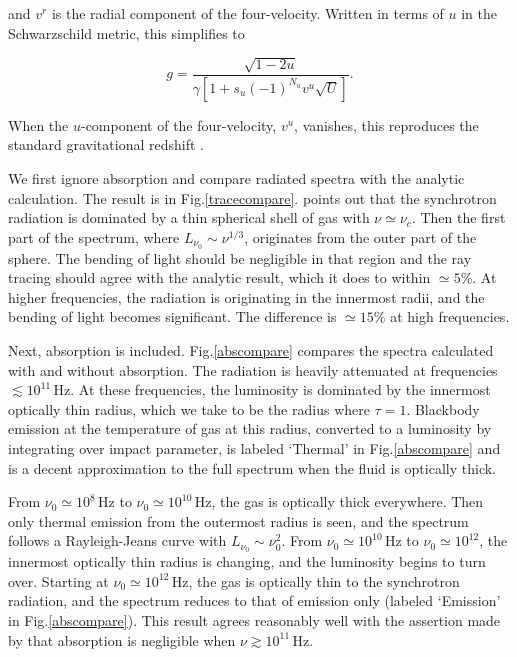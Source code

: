 \documentclass[apj]{emulateapj}
\begin{document}
\noindent and $v^r$ is the radial component of the four-velocity. Written in terms of $u$ in the Schwarzschild metric, this simplifies to 

\begin{equation}
  g = \frac{\sqrt{1-2u}}{\gamma[1+s_u(-1)^{N_u} v^u \sqrt{U}]}.
\end{equation}

\noindent When the $u$-component of the four-velocity, $v^u$, vanishes, this reproduces the standard gravitational redshift \citep{hartlebook}. 

We first ignore absorption and compare radiated spectra with the analytic calculation. The result is in Fig.\hspace{2pt}\ref{tracecompare}. \citet{shap2} points out that the synchrotron radiation is dominated by a thin spherical shell of gas with $\nu \simeq \nu_c$. Then the first part of the spectrum, where $L_{\nu_0} \sim \nu^{1/3}$, originates from the outer part of the sphere. The bending of light should be negligible in that region and the ray tracing should agree with the analytic result, which it does to within $\simeq 5\%$. At higher frequencies, the radiation is originating in the innermost radii, and the bending of light becomes significant. The difference is $\simeq 15\%$ at high frequencies.

Next, absorption is included. Fig.\hspace{2pt}\ref{abscompare} compares the spectra calculated with and without absorption. The radiation is heavily attenuated at frequencies $\lesssim 10^{11} \hspace{2pt} \mathrm{Hz}$. At these frequencies, the luminosity is dominated by the innermost optically thin radius, which we take to be the radius where $\tau=1$. Blackbody emission at the temperature of gas at this radius, converted to a luminosity by integrating over impact parameter, is labeled `Thermal' in Fig.\hspace{2pt}\ref{abscompare} and is a decent approximation to the full spectrum when the fluid is optically thick.
 
From $\nu_0 \simeq 10^8 \hspace{2pt} \mathrm{Hz}$ to $\nu_0 \simeq 10^{10} \hspace{2pt} \mathrm{Hz}$, the gas is optically thick everywhere. Then only thermal emission from the outermost radius is seen, and the spectrum follows a Rayleigh-Jeans curve with $L_{\nu_0} \sim \nu_0^2$. From $\nu_0 \simeq 10^{10} \hspace{2pt} \mathrm{Hz}$ to $\nu_0 \simeq 10^{12}$, the innermost optically thin radius is changing, and the luminosity begins to turn over. Starting at $\nu_0 \simeq 10^{12} \hspace{2pt} \mathrm{Hz}$, the gas is optically thin to the synchrotron radiation, and the spectrum reduces to that of emission only (labeled `Emission' in Fig.\hspace{2pt}\ref{abscompare}). This result agrees reasonably well with the assertion made by \citet{shap2} that absorption is negligible when $\nu \gtrsim 10^{11} \hspace{2pt} \mathrm{Hz}$.
\end{document}

